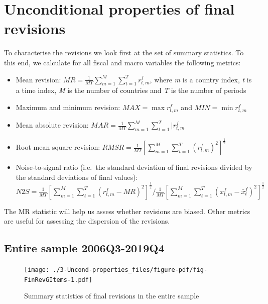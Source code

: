 \documentclass[
  letterpaper,
  authoryear,
  preprint,
  3p]{elsarticle}
\providecommand{\tightlist}{%
  \setlength{\itemsep}{0pt}\setlength{\parskip}{0pt}}\usepackage{longtable,booktabs,array}
\begin{document}

\hypertarget{sec-Magnitude-of-total}{%
\chapter{Unconditional properties of final
revisions}\label{sec-Magnitude-of-total}}

To characterise the revisions we look first at the set of summary
statistics. To this end, we calculate for all fiscal and macro variables
the following metrics:

\begin{itemize}
\tightlist
\item
  Mean revision:
  \(MR=\frac{1}{MT}\sum\limits_{m=1}^{M}\sum\limits_{t=1}^{T}r_{t,m}^{f}\),
  where \emph{m} is a country index, \emph{t} is a time index, \emph{M}
  is the number of countries and \emph{T} is the number of periods
\item
  Maximum and minimum revision: \(MAX=\max{r_{t,m}^{f}}\) and
  \(MIN=\min{r_{t,m}^{f}}\)
\item
  Mean absolute revision:
  \(MAR=\frac{1}{MT}\sum\limits_{m=1}^{M}\sum\limits_{t=1}^{T}|r_{t,m}^{f}\)\textbar{}
\item
  Root mean square revision:
  \(RMSR=\frac{1}{MT}\left[\sum\limits_{m=1}^{M}\sum\limits_{t=1}^{T}\left(r_{t,m}^{f}\right)^{2}\right]^{\frac{1}{2}}\)
\item
  Noise-to-signal ratio (i.e.~the standard deviation of final revisions
  divided by the standard deviations of final values):
  \(N2S=\frac{1}{MT}\left[\sum\limits_{m=1}^{M}\sum\limits_{t=1}^{T}\left(r_{t,m}^{f}-MR\right)^{2}\right]^{\frac{1}{2}}/{\frac{1}{MT}\left[\sum\limits_{m=1}^{M}\sum\limits_{t=1}^{T}\left(x_{t,m}^{f}-\bar{x}_{t}^{f}\right)^{2}\right]^{\frac{1}{2}}}\)
\end{itemize}

The MR statistic will help us assess whether revisions are biased. Other
metrics are useful for assessing the dispersion of the revisions.

\hypertarget{entire-sample-2006q3-2019q4}{%
\section{Entire sample
2006Q3-2019Q4}\label{entire-sample-2006q3-2019q4}}

\begin{figure}[H]

{\centering \texttt{[image: ./3-Uncond-properties\_files/figure-pdf/fig-FinRevGItems-1.pdf]}

}

\caption{\label{fig-FinRevGItems}Summary statistics of final revisions
in the entire sample}

\end{figure}
\end{document}
